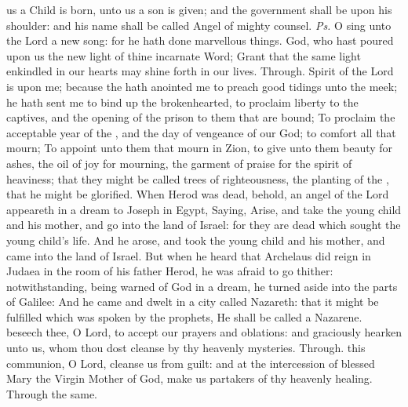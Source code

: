 \introit
{} us a Child is born, unto us a son is given; and the government shall be upon his shoulder: and his name shall be called Angel of mighty counsel. \textit{Ps.} O sing unto the Lord a new song: for he hath done marvellous things.
\collect
{} God, who hast poured upon us the new light of thine incarnate Word; Grant that the same light enkindled in our hearts may shine forth in our lives. Through.
 Spirit of the Lord  is upon me; because the  hath anointed me to preach good tidings unto the meek; he hath sent me to bind up the brokenhearted, to proclaim liberty to the captives, and the opening of the prison to them that are bound; To proclaim the acceptable year of the , and the day of vengeance of our God; to comfort all that mourn; To appoint unto them that mourn in Zion, to give unto them beauty for ashes, the oil of joy for mourning, the garment of praise for the spirit of heaviness; that they might be called trees of righteousness, the planting of the , that he might be glorified.
 When Herod was dead, behold, an angel of the Lord appeareth in a dream to Joseph in Egypt, Saying, Arise, and take the young child and his mother, and go into the land of Israel: for they are dead which sought the young child's life. And he arose, and took the young child and his mother, and came into the land of Israel. But when he heard that Archelaus did reign in Judaea in the room of his father Herod, he was afraid to go thither: notwithstanding, being warned of God in a dream, he turned aside into the parts of Galilee: And he came and dwelt in a city called Nazareth: that it might be fulfilled which was spoken by the prophets, He shall be called a Nazarene.
\secret
{} beseech thee, O Lord, to accept our prayers and oblations: and graciously hearken unto us, whom thou dost cleanse by thy heavenly mysteries. Through.
\postcommunion
{} this communion, O Lord, cleanse us from guilt: and at the intercession of blessed Mary the Virgin Mother of God, make us partakers of thy heavenly healing. Through the same.

